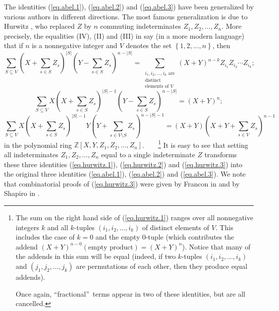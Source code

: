 \documentclass[numbers=enddot,12pt,final,onecolumn,notitlepage]{scrartcl}%
\theoremstyle{definition}
\let\sumnonlimits\sum
\renewcommand{\sum}{\sumnonlimits\limits}
\begin{document}
The identities (\ref{eq.abel.1}), (\ref{eq.abel.2}) and (\ref{eq.abel.3}) have
been generalized by various authors in different directions. The most famous
generalization is due to Hurwitz \cite{Hurwit02}, who replaced $Z$ by $n$
commuting indeterminates $Z_{1},Z_{2},\ldots,Z_{n}$. More precisely, the
equalities (IV), (II) and (III) in \cite{Hurwit02} say (in a more modern
language) that if $n$ is a nonnegative integer and $V$ denotes the set
$\left\{  1,2,\ldots,n\right\}  $, then%
\begin{equation}
\sum_{S\subseteq V}\left(  X+\sum_{s\in S}Z_{s}\right)  ^{\left\vert
S\right\vert }\left(  Y-\sum_{s\in S}Z_{s}\right)  ^{n-\left\vert S\right\vert
}=\sum_{\substack{i_{1},i_{2},\ldots,i_{k}\text{ are}\\\text{distinct}%
\\\text{elements of }V}}\left(  X+Y\right)  ^{n-k}Z_{i_{1}}Z_{i_{2}}\cdots
Z_{i_{k}};\ \ \ \ \ \label{eq.hurwitz.1}%
\end{equation}%
\begin{equation}
\sum_{S\subseteq V}X\left(  X+\sum_{s\in S}Z_{s}\right)  ^{\left\vert
S\right\vert -1}\left(  Y-\sum_{s\in S}Z_{s}\right)  ^{n-\left\vert
S\right\vert }=\left(  X+Y\right)  ^{n}; \label{eq.hurwitz.2}%
\end{equation}%
\begin{equation}
\sum_{S\subseteq V}X\left(  X+\sum_{s\in S}Z_{s}\right)  ^{\left\vert
S\right\vert -1}Y\left(  Y+\sum_{s\in V\setminus S}Z_{s}\right)
^{n-\left\vert S\right\vert -1}=\left(  X+Y\right)  \left(  X+Y+\sum_{s\in
V}Z_{s}\right)  ^{n-1} \label{eq.hurwitz.3}%
\end{equation}
in the polynomial ring $\mathbb{Z}\left[  X,Y,Z_{1},Z_{2},\ldots,Z_{n}\right]
$.\ \ \ \ \footnote{The sum on the right hand side of (\ref{eq.hurwitz.1})
ranges over all nonnegative integers $k$ and all $k$-tuples $\left(
i_{1},i_{2},\ldots,i_{k}\right)  $ of distinct elements of $V$. This includes
the case of $k=0$ and the empty $0$-tuple (which contributes the addend
$\left(  X+Y\right)  ^{n-0}\left(  \text{empty product}\right)  =\left(
X+Y\right)  ^{n}$). Notice that many of the addends in this sum will be equal
(indeed, if two $k$-tuples $\left(  i_{1},i_{2},\ldots,i_{k}\right)  $ and
$\left(  j_{1},j_{2},\ldots,j_{k}\right)  $ are permutations of each other,
then they produce equal addends).
\par
Once again, \textquotedblleft fractional\textquotedblright\ terms appear in
two of these identities, but are all cancelled.} It is easy to see that
setting all indeterminates $Z_{1},Z_{2},\ldots,Z_{n}$ equal to a single
indeterminate $Z$ transforms these three identities (\ref{eq.hurwitz.1}),
(\ref{eq.hurwitz.2}) and (\ref{eq.hurwitz.3}) into the original three
identities (\ref{eq.abel.1}), (\ref{eq.abel.2}) and (\ref{eq.abel.3}). We note
that combinatorial proofs of (\ref{eq.hurwitz.3}) were given by Francon in
\cite[Proposition 3.5]{Francon74} and by Shapiro in \cite{Shapir91}.
\end{document}
